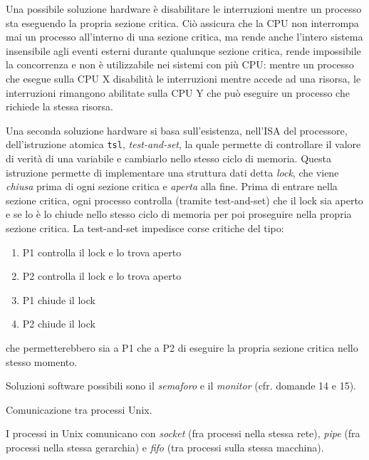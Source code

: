 \documentclass[answers,a4paper,12pt]{exam}
\begin{document}
\begin{questions}
\begin{solutionorlines}[3.8in]
Una possibile soluzione hardware è disabilitare le interruzioni mentre un processo sta eseguendo la propria sezione critica. Ciò assicura che la CPU non interrompa mai un processo all'interno di una sezione critica, ma rende anche l'intero sistema insensibile agli eventi esterni durante qualunque sezione critica, rende impossibile la concorrenza e non è utilizzabile nei sistemi con più CPU: mentre un processo che esegue sulla CPU X disabilità le interruzioni mentre accede ad una risorsa, le interruzioni rimangono abilitate sulla CPU Y che può eseguire un processo che richiede la stessa risorsa.

Una seconda soluzione hardware si basa sull'esistenza, nell'ISA del processore, dell'istruzione atomica \texttt{tsl}, \textit{test-and-set}, la quale permette di controllare il valore di verità di una variabile e cambiarlo nello stesso ciclo di memoria. Questa istruzione permette di implementare una struttura dati detta \textit{lock}, che viene \textit{chiusa} prima di ogni sezione critica e \textit{aperta} alla fine. Prima di entrare nella sezione critica, ogni processo controlla (tramite test-and-set) che il lock sia aperto e se lo è lo chiude nello stesso ciclo di memoria per poi proseguire nella propria sezione critica. La test-and-set impedisce corse critiche del tipo:
\begin{enumerate}
	\item P1 controlla il lock e lo trova aperto
	\item P2 controlla il lock e lo trova aperto
	\item P1 chiude il lock
	\item P2 chiude il lock
\end{enumerate}
che permetterebbero sia a P1 che a P2 di eseguire la propria sezione critica nello stesso momento. 

Soluzioni software possibili sono il \textit{semaforo} e il \textit{monitor} (cfr. domande 14 e 15).
\end{solutionorlines}

\question
Comunicazione tra processi Unix.
\begin{solutionorlines}[3.8in]
I processi in Unix comunicano con \textit{socket} (fra processi nella stessa rete), \textit{pipe} (fra processi nella stessa gerarchia) e \textit{fifo} (tra processi sulla stessa macchina). 


\end{solutionorlines}
\end{questions}
\end{document}
